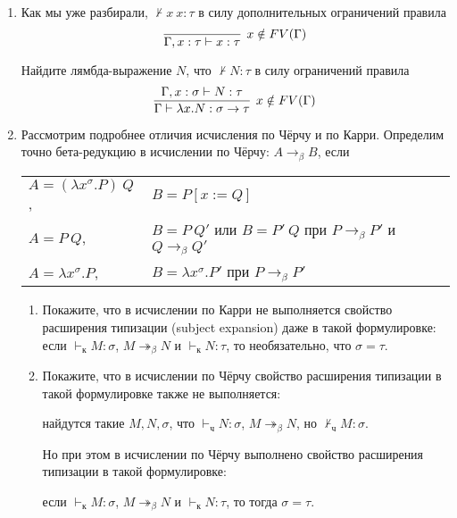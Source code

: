 \documentclass[10pt,a4paper,oneside]{article}
\begin{document}
\begin{enumerate}
\item Как мы уже разбирали, $\not\vdash x\ x:\tau$ в силу дополнительных ограничений
правила
$$\infer[x \notin FV(\Gamma)]{\Gamma, x:\tau\vdash x:\tau}{}$$

Найдите лямбда-выражение $N$, что $\not\vdash N:\tau$ в силу ограничений правила
$$\infer[x \notin FV(\Gamma)]{\Gamma \vdash \lambda x.N:\sigma\to\tau}{\Gamma, x:\sigma \vdash N:\tau}$$


\item Рассмотрим подробнее отличия исчисления по Чёрчу и по Карри. 
Определим точно бета-редукцию в исчислении по Чёрчу: $A \rightarrow_\beta B$, если

\begin{tabular}{ll}
$A = (\lambda x^\sigma.P)\ Q$, & $B = P [x := Q]$\\
$A = P\ Q$, & $B = P\ Q'$ или $B = P'\ Q$ при $P \rightarrow_\beta P'$ и $Q \rightarrow_\beta Q'$\\
$A = \lambda x^\sigma.P$, & $B = \lambda x^\sigma.P'$ при $P \rightarrow_\beta P'$
\end{tabular}

\begin{enumerate}
\item Покажите, что в исчислении по Карри не выполняется свойство расширения типизации
(subject expansion) даже в такой формулировке: 
если $\vdash_\text{к} M:\sigma$, $M \twoheadrightarrow_\beta N$ и $\vdash_\text{к} N:\tau$,
то необязательно, что $\sigma=\tau$.
\item Покажите, что в исчислении по Чёрчу свойство расширения типизации в такой формулировке также не выполняется:

\begin{center}найдутся такие $M,N,\sigma$, что $\vdash_\text{ч} N:\sigma$, $M\twoheadrightarrow_\beta N$, но $\not\vdash_\text{ч} M:\sigma$.\end{center}

Но при этом в исчислении по Чёрчу выполнено свойство расширения типизации в такой формулировке:

\begin{center}если $\vdash_\text{к} M:\sigma$, $M \twoheadrightarrow_\beta N$ и $\vdash_\text{к} N:\tau$,
то тогда $\sigma=\tau$.\end{center}
\end{enumerate}
\end{enumerate}
\end{document}
